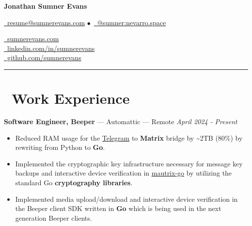 \documentclass[10pt,letterpaper]{article}
\begin{document}
\begin{minipage}[b][][b]{0.5\linewidth}
    {\huge\textbf{Jonathan Sumner Evans}}

    \vspace{5pt}
    \href{mailto:resume@sumnerevans.com}{\faEnvelope\ resume@sumnerevans.com}
    $\bullet$\ \href{https://matrix.to/#/@sumner:nevarro.space}{\faMatrixOrg\ @sumner:nevarro.space}
\end{minipage}\hfill
\begin{minipage}[b][][b]{0.278\linewidth}
    \href{https://sumnerevans.com}{\faGlobe\ sumnerevans.com} \\
    \href{https://www.linkedin.com/in/sumnerevans}{\faLinkedin\ linkedin.com/in/sumnerevans} \\
    \href{https://github.com/sumnerevans}{\faGithub\ github.com/sumnerevans}
\end{minipage}
\rule{\textwidth}{0.5pt}

\section*{\faBriefcase\ Work Experience}
{\fontsize{11}{0}
\textbf{Software Engineer, Beeper} --- Automattic --- Remote}
\hfill \textit{April 2024 - Present}
\begin{itemize}
    \item Reduced RAM usage for the
        \href{https://github.com/mautrix/telegramgo}{Telegram} to
        \textbf{Matrix} bridge by {\textasciitilde}2TB (80\%) by rewriting from
        Python to \textbf{Go}.
    \item Implemented the cryptographic key infrastructure necessary for message
        key backups and interactive device verification in
        \href{https://github.com/mautrix/go}{mautrix-go} by utilizing the
        standard Go \textbf{cryptography libraries}.
    \item Implemented media upload/download and interactive device verification
        in the Beeper client SDK written in \textbf{Go} which is being used in
        the next generation Beeper clients.
\end{itemize}
\end{document}
